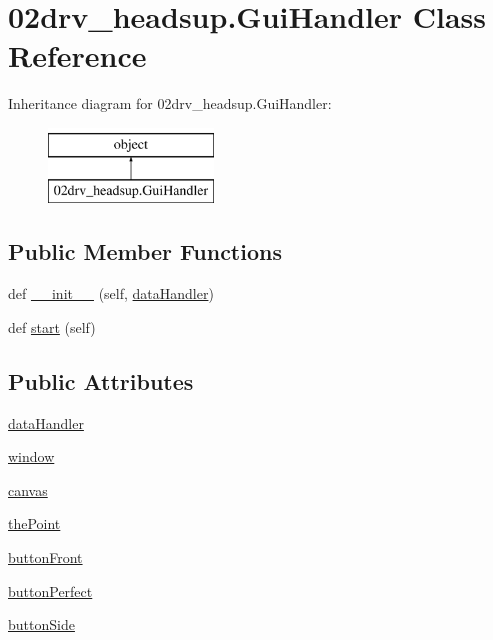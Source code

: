 \hypertarget{class02drv__headsup_1_1_gui_handler}{}\section{02drv\+\_\+headsup.Gui\+Handler Class Reference}
\label{class02drv__headsup_1_1_gui_handler}
Inheritance diagram for 02drv\+\_\+headsup.Gui\+Handler\+:\begin{figure}[H]
\begin{center}
\leavevmode
\includegraphics[height=2.000000cm]{class02drv__headsup_1_1_gui_handler}
\end{center}
\end{figure}
\subsection*{Public Member Functions}
\begin{DoxyCompactItemize}
\item 
def \hyperlink{class02drv__headsup_1_1_gui_handler_ace00e597941cecf6e00c45a21cda4465}{\+\_\+\+\_\+init\+\_\+\+\_\+} (self, \hyperlink{class02drv__headsup_1_1_gui_handler_a2775bfc8da60d278fd83e7bd5181765a}{data\+Handler})
\item 
def \hyperlink{class02drv__headsup_1_1_gui_handler_a9a6ec827afbe8ec07a3db5435c174690}{start} (self)
\end{DoxyCompactItemize}
\subsection*{Public Attributes}
\begin{DoxyCompactItemize}
\item 
\hyperlink{class02drv__headsup_1_1_gui_handler_a2775bfc8da60d278fd83e7bd5181765a}{data\+Handler}
\item 
\hyperlink{class02drv__headsup_1_1_gui_handler_a4caff282bebd00ef7bdf63f691caa517}{window}
\item 
\hyperlink{class02drv__headsup_1_1_gui_handler_ac6fd30b15298258734a1ad2c565777b1}{canvas}
\item 
\hyperlink{class02drv__headsup_1_1_gui_handler_af714e8f325912960d90a36cee9156a46}{the\+Point}
\item 
\hyperlink{class02drv__headsup_1_1_gui_handler_afccc2961424dae63bb06c856cecbed91}{button\+Front}
\item 
\hyperlink{class02drv__headsup_1_1_gui_handler_a3fbd010c529d6031ea7b79ac456cc82f}{button\+Perfect}
\item 
\hyperlink{class02drv__headsup_1_1_gui_handler_a415808846602519a790a038b95b01640}{button\+Side}
\end{DoxyCompactItemize}
